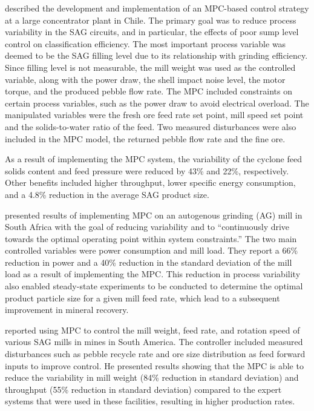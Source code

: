 \cite{yutronic_sag_2011} described the development and implementation of an MPC-based control strategy at a large concentrator plant in Chile. The primary goal was to reduce process variability in the \gls{SAG} circuits, and in particular, the effects of poor sump level control on classification efficiency. The most important process variable was deemed to be the \gls{SAG} filling level due to its relationship with grinding efficiency. Since filling level is not measurable, the mill weight was used as the controlled variable, along with the power draw, the shell impact noise level, the motor torque, and the produced pebble flow rate. The MPC included constraints on certain process variables, such as the power draw to avoid electrical overload. The manipulated variables were the fresh ore feed rate set point, mill speed set point and the solids-to-water ratio of the feed. Two measured disturbances were also included in the MPC model, the returned pebble flow rate and the fine ore.

As a result of implementing the MPC system, the variability of the cyclone feed solids content and feed pressure were reduced by 43\% and 22\%, respectively. Other benefits included higher throughput, lower specific energy consumption, and a 4.8\% reduction in the average \gls{SAG} product size.

\cite{steyn_benefits_2013} presented results of implementing MPC on an autogenous grinding (AG) mill in South Africa with the goal of reducing variability and to ``continuously drive towards the optimal operating point within system constraints.'' The two main controlled variables were power consumption and mill load. They report a 66\% reduction in power and a 40\% reduction in the standard deviation of the mill load as a result of implementing the MPC. This reduction in process variability also enabled steady-state experiments to be conducted to determine the optimal product particle size for a given mill feed rate, which lead to a subsequent improvement in mineral recovery.

\cite{gough_sag_2015} reported using MPC to control the mill weight, feed rate, and rotation speed of various \gls{SAG} mills in mines in South America. The controller included measured disturbances such as pebble recycle rate and ore size distribution as feed forward inputs to improve control. He presented results showing that the MPC is able to reduce the variability in mill weight (84\% reduction in standard deviation) and throughput (55\% reduction in standard deviation) compared to the expert systems that were used in these facilities, resulting in higher production rates.

